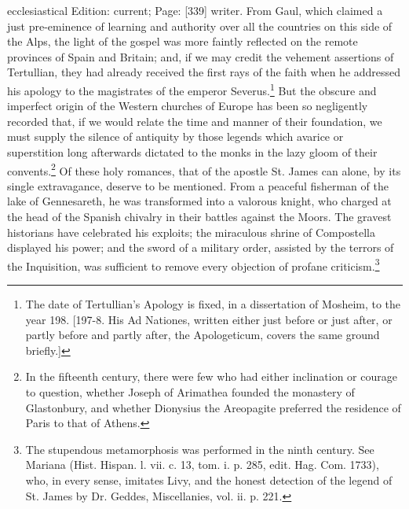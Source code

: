 ecclesiastical Edition: current; Page: [339] writer. From Gaul, which claimed a just pre-eminence of learning and authority over all the countries on this side of the Alps, the light of the gospel was more faintly reflected on the remote provinces of Spain and Britain; and, if we may credit the vehement assertions of Tertullian, they had already received the first rays of the faith when he addressed his apology to the magistrates of the emperor Severus.\footnote{The date of Tertullian\texthebrew{}’s Apology is fixed, in a dissertation of Mosheim, to the year 198. [197-8. His Ad Nationes, written either just before or just after, or partly before and partly after, the Apologeticum, covers the same ground briefly.]} But the obscure and imperfect origin of the Western churches of Europe has been so negligently recorded that, if we would relate the time and manner of their foundation, we must supply the silence of antiquity by those legends which avarice or superstition long afterwards dictated to the monks in the lazy gloom of their convents.\footnote{In the fifteenth century, there were few who had either inclination or courage to question, whether Joseph of Arimathea founded the monastery of Glastonbury, and whether Dionysius the Areopagite preferred the residence of Paris to that of Athens.} Of these holy romances, that of the apostle St. James can alone, by its single extravagance, deserve to be mentioned. From a peaceful fisherman of the lake of Gennesareth, he was transformed into a valorous knight, who charged at the head of the Spanish chivalry in their battles against the Moors. The gravest historians have celebrated his exploits; the miraculous shrine of Compostella displayed his power; and the sword of a military order, assisted by the terrors of the Inquisition, was sufficient to remove every objection of profane criticism.\footnote{The stupendous metamorphosis was performed in the ninth century. See Mariana (Hist. Hispan. l. vii. c. 13, tom. i. p. 285, edit. Hag. Com. 1733), who, in every sense, imitates Livy, and the honest detection of the legend of St. James by Dr. Geddes, Miscellanies, vol. ii. p. 221.}

